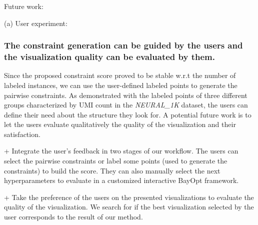 Future work:

(a) User experiment:
\subsubsection*{The constraint generation can be guided by the users and the visualization quality can be evaluated by them.}
Since the proposed constraint score proved to be stable w.r.t the number of labeled instances,
we can use the user-defined labeled points to generate the pairwise constraints.
As demonstrated with the labeled points of three different groups characterized by UMI count in the \emph{NEURAL\_1K} dataset, the users can define their need about the structure they look for.
A potential future work is to let the users evaluate qualitatively the quality of the visualization and their satisfaction.

+ Integrate the user's feedback in two stages of our workflow.
The users can select the pairwise constraints or label some points (used to generate the constraints) to build the score.
They can also manually select the next hyperparameters to evaluate in a customized interactive BayOpt framework.

+ Take the preference of the users on the presented visualizations to evaluate the quality of the visualization. We search for if the best visualization selected by the user corresponds to the result of our method.